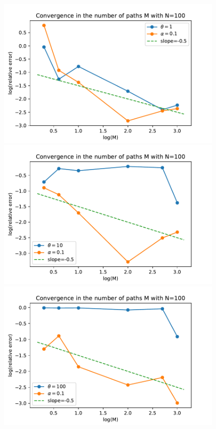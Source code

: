 \documentclass[aspectratio=169]{beamer}\usepackage[utf8]{inputenc}
\begin{document}
\begin{frame}
\begin{figure}
    \includegraphics[scale=0.22]{Figures/conv_M_moments_constant_func_1_01.pdf}
    \includegraphics[scale=0.22]{Figures/conv_M_moments_constant_func_10_01.pdf}
      \includegraphics[scale=0.22]{Figures/conv_M_moments_constant_func_100_01.pdf}
      

\end{figure}
\end{frame}
\end{document}

